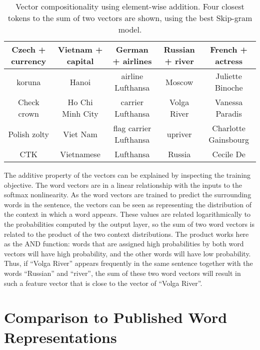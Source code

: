 \documentclass{article}
\begin{document}
\begin{table}
\small
  \begin{center}
  \begin{tabular}{|c|c|c|c|c|}
    \hline
    Czech + currency  & Vietnam + capital & German + airlines      &       Russian + river   &  French + actress             \\
    \hline
    koruna            & Hanoi             & airline Lufthansa      &       Moscow            &  Juliette Binoche     \\
    Check crown       & Ho Chi Minh City  & carrier Lufthansa      &       Volga River       &  Vanessa Paradis      \\
    Polish zolty      & Viet Nam          & flag carrier Lufthansa &       upriver           &  Charlotte Gainsbourg \\
    CTK               & Vietnamese        & Lufthansa              &       Russia            &  Cecile De                    \\
    \hline
  \end{tabular}
  \end{center}
\caption{\label{table:composition} Vector compositionality using element-wise addition. Four closest tokens to the sum
of two vectors are shown, using the best Skip-gram model.}
\end{table}

The additive property of the vectors can be explained by inspecting the
training objective.
The word vectors are in a linear relationship with the inputs
to the softmax nonlinearity.
As the word vectors are trained
to predict the surrounding words in the sentence, the vectors
can be seen as representing the distribution of the context in which a word
appears.  These values are related logarithmically to the probabilities
computed by the output layer, so the sum of two word vectors is related to
the product of the two context distributions. 
The product works here as the AND function: words that are
assigned high probabilities by both word vectors will have high probability, and
the other words will have low probability.
Thus, if ``Volga River'' appears frequently in the same sentence together
with the words ``Russian'' and ``river'', the sum of these two word vectors
will result in such a feature vector that is close to the vector of ``Volga River''.

\section{Comparison to Published Word Representations}
\end{document}
